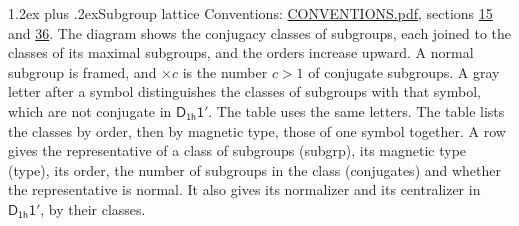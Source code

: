 \documentclass[10pt,a4paper]{article}
\makeatletter
\renewcommand\section{\@startsection{section}{1}{\z@}{-3ex plus -1ex minus -.2ex}%
  {1.2ex plus .2ex}{\normalfont\large\sffamily\bfseries\color{parttitle}}}
\numberwithin{equation}{section}
\newcommand{\grp}[1]{\mathsf{#1}}
\makeatother
\begin{document}
\section{Subgroup lattice}\label{s:subgroups}
Conventions: \href{../../CONVENTIONS.pdf}{CONVENTIONS.pdf}, sections \href{../../../rotation/CONVENTIONS.pdf\#conv.15}{15} and \href{../../CONVENTIONS.pdf\#conv.36}{36}.
The diagram shows the conjugacy classes of subgroups, each joined to the classes of its maximal subgroups, and the orders increase upward. \label{n:index.conjugates.c}A normal subgroup is framed, and ${\times}c$ is the number $c > 1$ of conjugate subgroups. \label{n:mark.letter}A gray letter after a symbol distinguishes the classes of subgroups with that symbol, which are not conjugate in $\grp{D_{1h}1'}$. The table uses the same letters. The table lists the classes by order, then by magnetic type, those of one symbol together. \label{n:head.subgroup}\label{n:head.magnetic.type}\label{n:head.order}\label{n:head.conjugates}\label{n:head.normal}A row gives the representative of a class of subgroups (subgrp), its magnetic type (type), its order, the number of subgroups in the class (conjugates) and whether the representative is normal. \label{n:head.normalizer}\label{n:head.centralizer}It also gives its normalizer and its centralizer in $\grp{D_{1h}1'}$, by their classes. 
\end{document}

